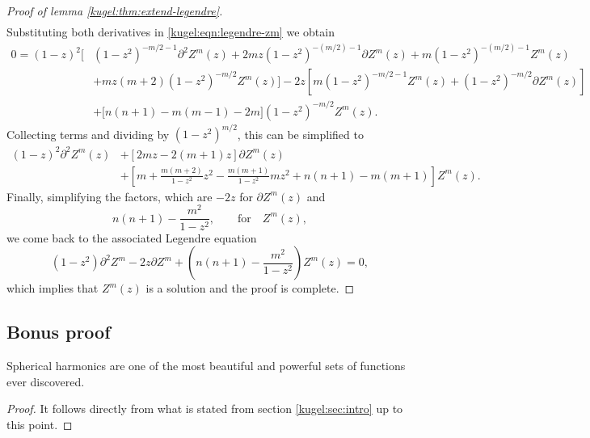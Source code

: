 \begin{proof}[Proof of lemma \ref{kugel:thm:extend-legendre}]
\begin{align*}
  \end{align*}
  Substituting both derivatives in \eqref{kugel:eqn:legendre-zm} we obtain
  \begin{align*}
    0 = (1-z)^2 \bigg[&
      (1-z^2)^{-m/2-1} \partial^2 Z^m(z)
        + 2mz(1-z^2)^{-(m/2) -1} \partial Z^m(z)
        + m (1-z^2)^{-(m/2)-1} Z^m(z) \\
        &+ mz(m+2)(1-z^2)^{-m/2} Z^m(z)
    \bigg] -2z \left[
      m(1 - z^2)^{-m/2 -1} Z^m(z)
      + (1 - z^2)^{-m/2} \partial Z^m(z)
    \right] \\
    &+ \bigl[ n(n + 1) - m(m-1) - 2m \bigr] (1-z^2)^{-m/2} Z^m(z).
  \end{align*}
  Collecting terms and dividing by $(1-z^2)^{m/2}$, this can be simplified to
  \begin{align*}
    (1-z)^2 \partial^2 Z^m(z) &+ \left[
      2mz - 2(m+1)z
    \right] \partial Z^m(z) \\
    &+ \left[
      m + \frac{m(m+2)}{1-z^2} z^2 - \frac{m(m+1)}{1-z^2} mz^2
      + n(n+1) - m(m+1)
    \right] Z^m(z).
  \end{align*}
  Finally, simplifying the factors, which are $-2z$ for $\partial Z^m(z)$ and
  \begin{equation*}
    n(n+1) - \frac{m^2}{1-z^2},
    \qquad \text{for} \quad Z^m(z),
  \end{equation*}
  we come back to the associated Legendre equation
  \begin{equation*}
    (1 - z^2) \partial^2 Z^m
    - 2z \partial Z^m
    + \left( n(n + 1) - \frac{m^2}{1 - z^2} \right) Z^m(z) = 0,
  \end{equation*}
  which implies that $Z^m(z)$ is a solution and the proof is complete.
  \qedhere
\end{proof}

\subsection*{Bonus proof}
\begin{theorem}
  Spherical harmonics are one of the most beautiful and powerful sets of
  functions ever discovered.
\end{theorem}
\begin{proof}
  It follows directly from what is stated from section \ref{kugel:sec:intro} up to this point.
\end{proof}
